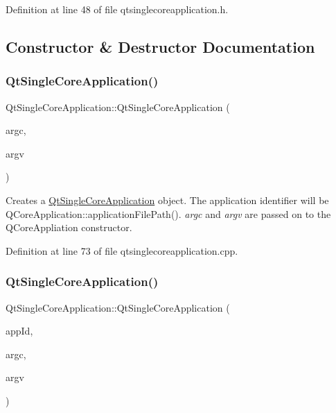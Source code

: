 Definition at line 48 of file qtsinglecoreapplication.\+h.



\subsection{Constructor \& Destructor Documentation}
\mbox{\label{class_qt_single_core_application_a1329cb65a5706c21257f191b9d8b6548}} 
\subsubsection{\texorpdfstring{Qt\+Single\+Core\+Application()}{QtSingleCoreApplication()}\hspace{0.1cm}{\footnotesize\ttfamily [1/2]}}
{\footnotesize\ttfamily Qt\+Single\+Core\+Application\+::\+Qt\+Single\+Core\+Application (\begin{DoxyParamCaption}\item[{int \&}]{argc,  }\item[{char $\ast$$\ast$}]{argv }\end{DoxyParamCaption})}

Creates a \hyperlink{class_qt_single_core_application}{Qt\+Single\+Core\+Application} object. The application identifier will be Q\+Core\+Application\+::application\+File\+Path(). {\itshape argc} and {\itshape argv} are passed on to the Q\+Core\+Appliation constructor. 

Definition at line 73 of file qtsinglecoreapplication.\+cpp.

\mbox{\label{class_qt_single_core_application_a2c5792a0addef95dd78b37ab55a985a7}} 
\subsubsection{\texorpdfstring{Qt\+Single\+Core\+Application()}{QtSingleCoreApplication()}\hspace{0.1cm}{\footnotesize\ttfamily [2/2]}}
{\footnotesize\ttfamily Qt\+Single\+Core\+Application\+::\+Qt\+Single\+Core\+Application (\begin{DoxyParamCaption}\item[{const Q\+String \&}]{app\+Id,  }\item[{int \&}]{argc,  }\item[{char $\ast$$\ast$}]{argv }\end{DoxyParamCaption})}

